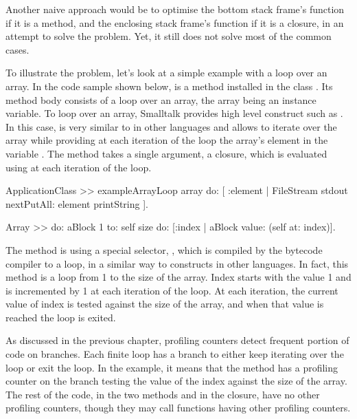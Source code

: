 \documentclass[a4paper,12pt,twoside]{../includes/ThesisStyle}
\begin{document}
Another naive approach would be to optimise the bottom stack frame's function if it is a method, and the enclosing stack frame's function if it is a closure, in an attempt to solve the problem. Yet, it still does not solve most of the common cases. 

To illustrate the problem, let's look at a simple example with a loop over an array. In the code sample shown below,  is a method installed in the class . Its method body consists of a loop over an array, the array being an instance variable. To loop over an array, Smalltalk provides high level construct such as . In this case,  is very similar to  in other languages and allows to iterate over the array while providing at each iteration of the loop the array's element in the variable . The  method takes a single argument, a closure, which is evaluated using  at each iteration of the loop.

\begin{code}
	ApplicationClass >> exampleArrayLoop
	    array do: [ :element | FileStream stdout nextPutAll: element printString ].
		
	Array >> do: aBlock
	    1 to: self size do: [:index | aBlock value: (self at: index)].
\end{code}

The method  is using a special selector, , which is compiled by the bytecode compiler to a loop, in a similar way to  constructs in other languages. In fact, this method is a loop from 1 to the size of the array. Index starts with the value 1 and is incremented by 1 at each iteration of the loop. At each iteration, the current value of index is tested against the size of the array, and when that value is reached the loop is exited.

As discussed in the previous chapter, profiling counters detect frequent portion of code on branches. Each finite loop has a branch to either keep iterating over the loop or exit the loop. In the example, it means that the method  has a profiling counter on the branch testing the value of the index against the size of the array. The rest of the code, in the two methods and in the closure, have no other profiling counters, though they may call functions having other profiling counters.
\end{document}

